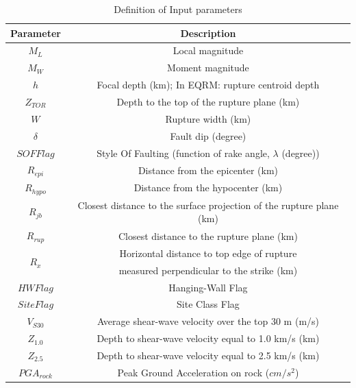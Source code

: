 \begin{table}[!t]
\renewcommand{\arraystretch}{1.3}
\caption{Definition of Input parameters} \label{def} \centering
\begin{tabular}{|c|c|}
\hline Parameter& Description\\

\hline $M_L$ & {\small Local magnitude}\\

\hline $M_W$ & {\small Moment magnitude}\\

\hline $h$ & {\small Focal depth (km); In EQRM: rupture centroid depth}\\

\hline $Z_{TOR}$ & {\small Depth to the top of the rupture plane (km)}\\

\hline $W$ & {\small Rupture width (km)}\\

\hline $\delta$ & {\small Fault dip (degree)}\\

\hline $SOFFlag$ & {\small Style Of Faulting (function of rake
angle, $\lambda$
(degree))}\\

\hline $R_{epi}$ & {\small Distance from the epicenter (km)}\\

\hline $R_{hypo}$ & {\small Distance from the hypocenter (km)}\\

\hline $R_{jb}$ & {\small Closest distance to the surface projection
of the
rupture plane (km)}\\

\hline $R_{rup}$ & {\small Closest distance to the rupture plane (km)}\\

\hline \multirow{2}{*}{$R_x$} & {\small Horizontal distance to top edge of rupture}\\
 &{\small measured
perpendicular to the strike (km)}\\

\hline $HW Flag$ & {\small Hanging-Wall Flag}\\

\hline $Site Flag$ & {\small Site Class Flag}\\

\hline $V_{S30}$ & {\small Average shear-wave velocity over the top 30 m (m/s)}\\

\hline $Z_{1.0}$ & {\small Depth to shear-wave velocity equal to 1.0
km/s
(km)}\\

\hline $Z_{2.5}$ & {\small Depth to shear-wave velocity equal to 2.5
km/s
(km)}\\

\hline $PGA_{rock}$ &{\small Peak Ground Acceleration on rock ($cm/s^2$)}\\
\hline

\end{tabular}
\end{table}






